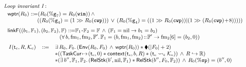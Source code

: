 \begin{figure}[!t]
    \centering
    \[
        \small
        \begin{array}{l}
            \textit{Loop invariant I}: \\
            \\[-9pt] \ \ 
            \wptr(\RFile_0) \define 
            (\RFile_0(\greg{7}) = \RFile_0(\regwim)) \, \land \, \\
            \hspace*{6em} 
            ((\RFile_0(\greg{4}) = (1 >\!\!> \RFile_0(\regcwp))) \, \lor \, 
                (\RFile_0(\greg{4}) = ((1 >\!\!> \RFile_0(\regcwp)) | (1 >\!\!> (\RFile_0(\regcwp)\!+\!8))))) \\
            \\[-5pt] \ \ 
            \linkF((\block_1, \hWstk_1), (\block_2, \hWstk_2), \hWstk) \define 
            \hWstk_1 \lstApp \hWstk_2 = \hWstk \, \land \, 
            (\hWstk_1 = \nil \rightarrow \block_1 = \block_2) \\
            \hspace*{10em}
            (\forall \, \block, \fm_1, \fm_2, \hWstk'. \, 
                \hWstk_1 = (\block, \fm_1, \fm_2) \stCons \hWstk' \rightarrow
                \fm_2[6] = (\block_2, 0)
            )
            \\
            \\[-5pt]
            \begin{array}{lcl} \ 
                I(\thrdid_c, \RFile, \hthrdlocalst_c) & \define & 
                \exists \, \RFile_0, \Wstack_0. \, 
                (\Env{\RFile_0, \Wstack_0} \, \land \, 
                \wptr(\RFile_0)) \sepstar 
                \metricAst{|\Wstack_0| + 2} \\
                & & 
                \sepstar
                (
                (
                    \msto{\TaskCur}{(\thrdid_c, 0)} \sepstar 
                    \relcontext{\thrdid_c}{\block}{\RFile} \sepstar 
                    (\astCurCont{\thrdid_c}{\hthrdlocalst_c})
                ) 
                \, \land \, \Rinj{\RFile}{\hRfile}) \\
                & & \sepstar
                (
                    \exists \, \block'', \hWstk_1, \hWstk_2. \, 
                    (\RelStk{\block'}{\nil}{\hWstk_1} \sepstar 
                        \RelStk{\block''}{\Wstack_0}{\hWstk_2}) \,
                    \land \, 
                    \RFile_0(\spreg) = (\block'', 0) \\

\end{array}
\end{array}\]
\end{figure}
